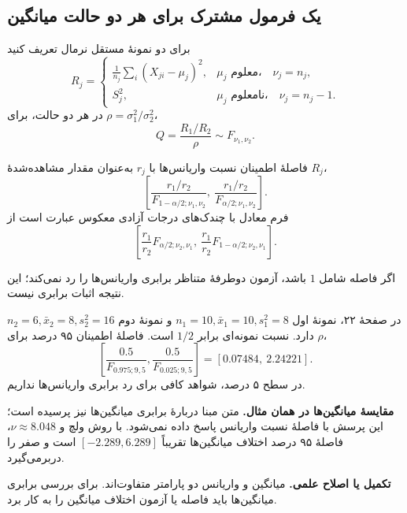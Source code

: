 \documentclass[12pt,a4paper,oneside]{report}
\newcounter{ex}[chapter]
\newenvironment{example}[1]{\refstepcounter{ex}\begin{tcolorbox}[breakable=false,title={مثال \thechapter.\arabic{ex} | #1},colframe=muted,colback=white]}{\end{tcolorbox}}
\newcommand{\edit}[1]{\par\begingroup\small\color{alert}\textbf{تکمیل یا اصلاح علمی.} #1\par\endgroup}
\begin{document}
\subsection{یک فرمول مشترک برای هر دو حالت میانگین}
برای دو نمونهٔ مستقل نرمال تعریف کنید
\[
R_j=\begin{cases}
\displaystyle\frac1{n_j}\sum_i(X_{ji}-\mu_j)^2,&\mu_j\text{ معلوم،}\quad\nu_j=n_j,\\[4pt]
S_j^2,&\mu_j\text{ نامعلوم،}\quad\nu_j=n_j-1.
\end{cases}
\]
در هر دو حالت، برای $\rho=\sigma_1^2/\sigma_2^2$،
\[Q=\frac{R_1/R_2}{\rho}\sim F_{\nu_1,\nu_2}.\]
\begin{result}{فاصلهٔ اطمینان نسبت واریانس‌ها}
با $r_j$ به‌عنوان مقدار مشاهده‌شدهٔ $R_j$،
\[
\boxed{\left[\frac{r_1/r_2}{F_{1-\alpha/2;\nu_1,\nu_2}},\
\frac{r_1/r_2}{F_{\alpha/2;\nu_1,\nu_2}}\right].}
\]
فرم معادل با چندک‌های درجات آزادی معکوس عبارت است از
\[
\left[\frac{r_1}{r_2}F_{\alpha/2;\nu_2,\nu_1},\
\frac{r_1}{r_2}F_{1-\alpha/2;\nu_2,\nu_1}\right].
\]
\end{result}
اگر فاصله شامل $1$ باشد، آزمون دوطرفهٔ متناظر برابری واریانس‌ها را رد نمی‌کند؛ این نتیجه اثبات برابری نیست.
\begin{example}{دو نمونه با واریانس‌های ۸ و ۱۶}
در صفحهٔ ۲۲، نمونهٔ اول $n_1=10,\bar x_1=10,s_1^2=8$ و نمونهٔ دوم $n_2=6,\bar x_2=8,s_2^2=16$ دارد. نسبت نمونه‌ای برابر $1/2$ است. فاصلهٔ اطمینان ۹۵ درصد برای $\rho$،
\[
\left[\frac{0.5}{F_{0.975;9,5}},\frac{0.5}{F_{0.025;9,5}}\right]
=\boxed{[0.07484,\ 2.24221]}.
\]
در سطح ۵ درصد، شواهد کافی برای رد برابری واریانس‌ها نداریم.

\textbf{مقایسهٔ میانگین‌ها در همان مثال.} متن مبنا دربارهٔ برابری میانگین‌ها نیز پرسیده است؛ این پرسش با فاصلهٔ نسبت واریانس پاسخ داده نمی‌شود. با روش ولچ و $\nu\approx8.048$، فاصلهٔ ۹۵ درصد اختلاف میانگین‌ها تقریباً $[-2.289,6.289]$ است و صفر را دربرمی‌گیرد.
\edit{میانگین و واریانس دو پارامتر متفاوت‌اند. برای بررسی برابری میانگین‌ها باید فاصله یا آزمون اختلاف میانگین را به کار برد.}
\end{example}
\end{document}
